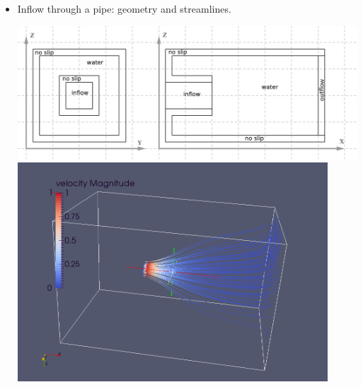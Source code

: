 \documentclass[a4paper, 12pt]{article}
\begin{document}
\begin{itemize}
\item Inflow through a pipe: geometry and streamlines.\\
\begin{center}
\includegraphics[height=5cm]{pipeinflow.png}
\includegraphics[height=8.2cm]{pipeinflw.png}
\end{center}


\end{itemize}
\end{document}
